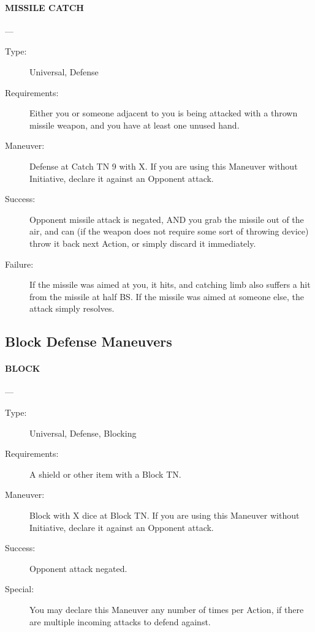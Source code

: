 \documentclass[oneside,11pt,english]{book}
\begin{document}
\paragraph{\large\label{man:MISSILE CATCH} MISSILE CATCH}---\quad{\large[2+X]}
\vspace{-10pt}\begin{description} 
\item [Type:] Universal, Defense 
\item [Requirements:] Either you or someone adjacent to you is being attacked with a thrown missile weapon, 
and you have at least one unused hand. 
\item [Maneuver:] Defense at Catch TN 9 with X. If you are using this Maneuver without Initiative, declare it 
against an Opponent attack. 
\item [Success:] Opponent missile attack is negated, AND you grab the missile out of the air, and can (if the 
weapon does not require some sort of throwing device) throw it back next Action, or simply discard it 
immediately. 
\item [Failure:] If the missile was aimed at you, it hits, and catching limb also suffers a hit from the missile at 
half BS. If the missile was aimed at someone else, the attack simply resolves. 
\end{description}
\subsection{Block Defense Maneuvers}
\paragraph{\large\label{man:BLOCK} BLOCK}---\quad{\large[X]}
\vspace{-10pt}\begin{description} 
\item [Type:] Universal, Defense, Blocking 
\item [Requirements:] A shield or other item with a Block TN. 
\item [Maneuver:] Block with X dice at Block TN. If you are using this Maneuver without Initiative, declare it 
against an Opponent attack. 
\item [Success:] Opponent attack negated. 
\item [Special:] You may declare this Maneuver any number of times per Action, if there are multiple incoming 
attacks to defend against. 
\end{description}
\end{document}
